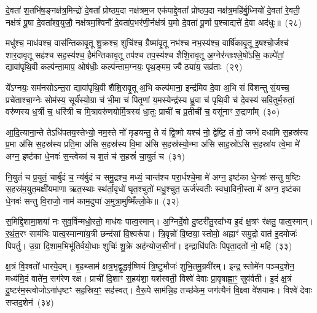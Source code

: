 दे॒वता॑ श॒तभि॑ष॒ङ्नक्ष॑त्र॒मिन्द्रो॑ दे॒वता᳚ प्रोष्ठप॒दा नक्ष॑त्रम॒ज एक॑पाद्दे॒वता᳚ प्रोष्ठप॒दा नक्ष॑त्र॒महि॑र्बु॒ध्नियो॑ दे॒वता॑ रे॒वती॒ नक्ष॑त्रं पू॒षा दे॒वता᳚श्व॒युजौ॒ नक्ष॑त्रम॒श्विनौ॑ दे॒वता॑प॒भर॑णी॒र्नक्ष॑त्रं य॒मो दे॒वता॑ पू॒र्णा प॒श्चाद्यत्ते॑ दे॒वा अद॑धुः॥~(२८)

{\anuvakamend[{फल्गु॑नी॒ नक्ष॑त्रं॒ वस॑व॒स्त्रय॑स्त्रिꣳशच्च}]}%

मधु॑श्च॒ माध॑वश्च॒ वास॑न्तिकावृ॒तू शु॒क्रश्च॒ शुचि॑श्च॒ ग्रैष्मा॑वृ॒तू नभ॑श्च नभ॒स्य॑श्च॒ वार्\mbox{}षि॑कावृ॒तू इ॒षश्चो॒र्जश्च॑ शार॒दावृ॒तू सह॑श्च सह॒स्य॑श्च॒ हैम॑न्तिकावृ॒तू तप॑श्च तप॒स्य॑श्च शैशि॒रावृ॒तू अ॒ग्नेर॑न्तःश्ले॒षो॑\-ऽसि॒ कल्पे॑तां॒ द्यावा॑पृथि॒वी कल्प॑न्ता॒माप॒ ओष॑धीः॒ कल्प॑न्ताम॒ग्नयः॒ पृथ॒ङ्मम॒ ज्यैठ्या॑य॒ सव्र॑ताः~(२९)

ये᳚\-ऽग्नयः॒ सम॑नसो\-ऽन्त॒रा द्यावा॑पृथि॒वी शै॑शि॒रावृ॒तू अ॒भि कल्प॑माना॒ इन्द्र॑मिव दे॒वा अ॒भि सं वि॑शन्तु सं॒यच्च॒ प्रचे॑ताश्चा॒ग्नेः सोम॑स्य॒ सूर्य॑स्यो॒ग्रा च॑ भी॒मा च॑ पितृ॒णां य॒मस्येन्द्र॑स्य ध्रु॒वा च॑ पृथि॒वी च॑ दे॒वस्य॑ सवि॒तुर्म॒रुतां॒ वरु॑णस्य ध॒र्त्री च॒ धरि॑त्री च मि॒त्रावरु॑णयोर्मि॒त्रस्य॑ धा॒तुः प्राची॑ च प्र॒तीची॑ च॒ वसू॑नाꣳ रु॒द्राणा᳚म्~(३०)

आ॒दि॒त्याना॒न्ते ते\-ऽधि॑पतय॒स्तेभ्यो॒ नम॒स्ते नो॑ मृडयन्तु॒ ते यं द्वि॒ष्मो यश्च॑ नो॒ द्वेष्टि॒ तं वो॒ जम्भे॑ दधामि स॒हस्र॑स्य प्र॒मा अ॑सि स॒हस्र॑स्य प्रति॒मा अ॑सि स॒हस्र॑स्य वि॒मा अ॑सि स॒हस्र॑स्यो॒न्मा अ॑सि साह॒स्रो॑\-ऽसि स॒हस्रा॑य त्वे॒मा मे॑ अग्न॒ इष्ट॑का धे॒नवः॑ स॒न्त्वेका॑ च श॒तं च॑ स॒हस्रं॑ चा॒युतं॑ च~(३१)

नि॒युतं॑ च प्र॒युतं॒ चार्बु॑दं च॒ न्य॑र्बुदं च समु॒द्रश्च॒ मध्यं॒ चान्त॑श्च परा॒र्धश्चे॒मा मे॑ अग्न॒ इष्ट॑का धे॒नवः॑ सन्तु ष॒ष्टिः स॒हस्र॑म॒युत॒मक्षी॑यमाणा ऋत॒स्थाः स्थ॑र्ता॒वृधो॑ घृत॒श्चुतो॑ मधु॒श्चुत॒ ऊर्ज॑स्वतीः स्वधा॒विनी॒स्ता मे॑ अग्न॒ इष्ट॑का धे॒नवः॑ सन्तु वि॒राजो॒ नाम॑ काम॒दुघा॑ अ॒मुत्रा॒मुष्मिँ॑ल्लो॒के॥~(३२)

{\anuvakamend[{सव्र॑ता रु॒द्राणा॑म॒युतं॑ च॒ पञ्च॑चत्वारिꣳशच्च}]}%

स॒मिद्दि॒शामा॒शया॑ नः सुव॒र्विन्मधो॒रतो॒ माध॑वः पात्व॒स्मान्। अ॒ग्निर्दे॒वो दु॒ष्टरी॑तु॒रदा᳚भ्य इ॒दं क्ष॒त्रꣳ र॑क्षतु॒ पात्व॒स्मान्। र॒थं॒त॒रꣳ साम॑भिः पात्व॒स्मान्गा॑य॒त्री छन्द॑सां वि॒श्वरू॑पा। त्रि॒वृन्नो॑ वि॒ष्ठया॒ स्तोमो॒ अह्नाꣳ॑ समु॒द्रो वात॑ इ॒दमोजः॑ पिपर्तु। उ॒ग्रा दि॒शाम॒भिभू॑तिर्वयो॒धाः शुचिः॑ शु॒क्रे अह॑न्योज॒सीना᳚। इन्द्राधि॑पतिः पिपृता॒दतो॑ नो॒ महि॑~(३३)

क्ष॒त्रं वि॒श्वतो॑ धारये॒दम्। बृ॒हथ्साम॑ क्षत्र॒भृद्वृ॒द्धवृ॑ष्णियं त्रि॒ष्टुभौजः॑ शुभि॒तमु॒ग्रवी॑रम्। इन्द्र॒ स्तोमे॑न पञ्चद॒शेन॒ मध्य॑मि॒दं वाते॑न॒ सग॑रेण रक्ष। प्राची॑ दि॒शाꣳ स॒हय॑शा॒ यश॑स्वती॒ विश्वे॑ देवाः प्रा॒वृषाह्ना॒ꣳ॒ सुव॑र्वती। इ॒दं क्ष॒त्रं दु॒ष्टर॑म॒स्त्वोजो\-ऽना॑धृष्टꣳ सह॒स्रिय॒ꣳ॒ सह॑स्वत्। वै॒रू॒पे साम॑न्नि॒ह तच्छ॑केम॒ जग॑त्यैनं वि॒क्ष्वा वे॑शयामः। विश्वे॑ देवाः सप्तद॒शेन॑~(३४)

